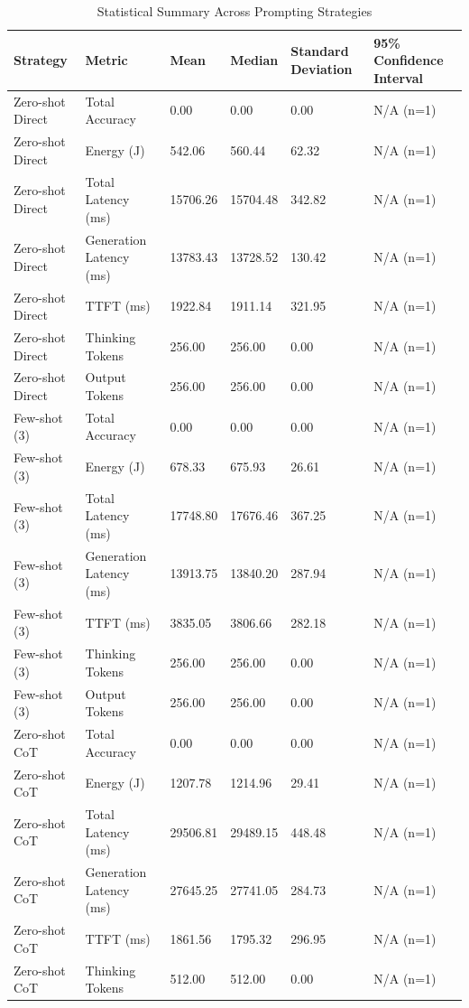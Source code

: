 \begin{table}
\caption{Statistical Summary Across Prompting Strategies}
\label{tab:statistical_summary}
\begin{tabular}{llllll}
\toprule
Strategy & Metric & Mean & Median & Standard Deviation & 95\% Confidence Interval \\
\midrule
Zero-shot Direct & Total Accuracy & 0.00 & 0.00 & 0.00 & N/A (n=1) \\
Zero-shot Direct & Energy (J) & 542.06 & 560.44 & 62.32 & N/A (n=1) \\
Zero-shot Direct & Total Latency (ms) & 15706.26 & 15704.48 & 342.82 & N/A (n=1) \\
Zero-shot Direct & Generation Latency (ms) & 13783.43 & 13728.52 & 130.42 & N/A (n=1) \\
Zero-shot Direct & TTFT (ms) & 1922.84 & 1911.14 & 321.95 & N/A (n=1) \\
Zero-shot Direct & Thinking Tokens & 256.00 & 256.00 & 0.00 & N/A (n=1) \\
Zero-shot Direct & Output Tokens & 256.00 & 256.00 & 0.00 & N/A (n=1) \\
Few-shot (3) & Total Accuracy & 0.00 & 0.00 & 0.00 & N/A (n=1) \\
Few-shot (3) & Energy (J) & 678.33 & 675.93 & 26.61 & N/A (n=1) \\
Few-shot (3) & Total Latency (ms) & 17748.80 & 17676.46 & 367.25 & N/A (n=1) \\
Few-shot (3) & Generation Latency (ms) & 13913.75 & 13840.20 & 287.94 & N/A (n=1) \\
Few-shot (3) & TTFT (ms) & 3835.05 & 3806.66 & 282.18 & N/A (n=1) \\
Few-shot (3) & Thinking Tokens & 256.00 & 256.00 & 0.00 & N/A (n=1) \\
Few-shot (3) & Output Tokens & 256.00 & 256.00 & 0.00 & N/A (n=1) \\
Zero-shot CoT & Total Accuracy & 0.00 & 0.00 & 0.00 & N/A (n=1) \\
Zero-shot CoT & Energy (J) & 1207.78 & 1214.96 & 29.41 & N/A (n=1) \\
Zero-shot CoT & Total Latency (ms) & 29506.81 & 29489.15 & 448.48 & N/A (n=1) \\
Zero-shot CoT & Generation Latency (ms) & 27645.25 & 27741.05 & 284.73 & N/A (n=1) \\
Zero-shot CoT & TTFT (ms) & 1861.56 & 1795.32 & 296.95 & N/A (n=1) \\
Zero-shot CoT & Thinking Tokens & 512.00 & 512.00 & 0.00 & N/A (n=1) \\

\end{tabular}
\end{table}
